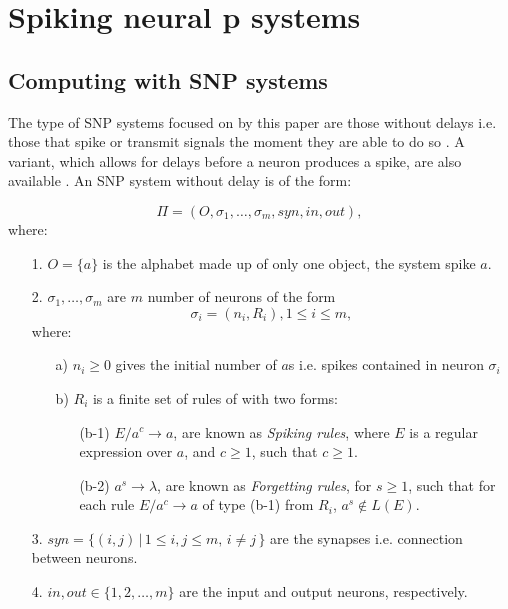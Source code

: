 \documentclass{acm_proc_article-sp}
\begin{document}



\section{Spiking neural p systems}

\subsection{Computing with SNP systems}
The type of SNP systems focused on by this paper are those without delays i.e. those that spike or transmit signals the moment they are able to do so \cite{snpbrain}\cite{snpmat}. A variant, which allows for delays before a neuron produces a spike, are also available \cite{snp}. An SNP system without delay is of the form:


\begin{definition} 
$$\Pi=(O,\sigma_1,\ldots, \sigma_m, syn, in, out),$$
where:
\begin{enumerate}
\item[1.] $O=\{a\}$ is the alphabet made up of only one object, the system spike $a$.

\item[2.] $\sigma_1,\ldots, \sigma_m$ are $m$ number of neurons of the form
$$\sigma_{i}=(n_i, R_i),1\leq i\leq m,$$
where:
\begin{enumerate}
\item[a)] $n_i\geq 0$ gives the initial number of $a$s i.e. spikes contained in neuron $\sigma_i$
\item[b)] $R_i$ is a finite set of rules of with two forms:
\begin{enumerate}
\item[(b-1)]$E/a^c \rightarrow a$, are known as \textit{Spiking rules}, where $E$ is a regular expression
over $a$, and $c\geq 1$, such that $c\geq 1$. 
\item[(b-2)]$a^s\rightarrow \lambda$, are known as \textit{Forgetting rules}, for $s\geq 1$, such that for each rule $E/a^c\rightarrow a$ of type (b-1) from $R_i$, $a^s\notin L(E)$. 
\end{enumerate}
\end{enumerate}
\item[3.] $syn= \{ (i,j)\, |\, 1\leq i,j \leq m, \, i\neq j\, \}$ are the synapses i.e. connection between neurons.

\item[4.] $in, out\in \{1,2,\ldots, m\}$ are the input and output neurons, respectively.
\end{enumerate}

\end{definition}
\end{document}

